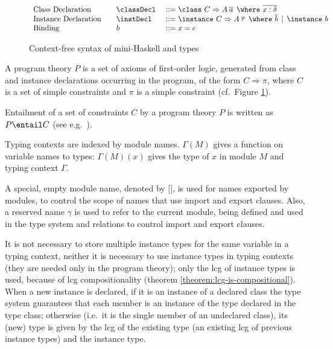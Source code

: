 \begin{figure}
\[\begin{array}[c]{llll}
\textrm{Class Declaration}  &         & \classDecl\    & ::= \class\ C \Rightarrow A\: \overline{a}\:\: \where\ \overline{x:\delta}\\
\textrm{Instance Declaration} &       & \instDecl\     & ::= \instance\ C \Rightarrow A\: \overline{\tau}\:\: \where\ \overline{b} 
                                                             \,\mid\, \instance\ b\\
\textrm{Binding}              &       & b              & ::= x = e 
\end{array} \]
\caption{Context-free syntax of mini-Haskell and types}
\label{fig:mini-Haskell-context-free-syntax}
\end{figure}

A program theory $P$ is a set of axioms of first-order logic,
generated from class and instance declarations occurring in the
program, of the form $C \Rightarrow \pi$, where $C$ is a set of simple
constraints and $\pi$ is a simple constraint (cf.~Figure
\ref{fig:mini-Haskell-context-free-syntax}).

Entailment of a set of constraints $C$ by a program theory $P$ is
written as $P \entail C$ (see
e.g.~\cite{JBCS-Ambiguity-and-constrained-polymorphism}).

Typing contexts are indexed by module names. $\Gamma(M)$ gives a
function on variable names to types: $\Gamma(M)(x)$ gives the type of
$x$ in module $M$ and typing context $\Gamma$.
   
A special, empty module name, denoted by $\texttt{[]}$, is used for
names exported by modules, to control the scope of names that use
import and export clauses. Also, a reserved name $\gamma$ is used to
refer to the current module, being defined and used in the type system
and relations to control import and export clauses.

It is not necessary to store multiple instance types for the same
variable in a typing context, neither it is necessary to use instance
types in typing contexts (they are needed only in the program theory);
only the lcg of instance types is used, because of lcg
compositionality (theorem \ref{theorem:lcg-is-compositional}). When a
new instance is declared, if it is an instance of a declared class the
type system guarantees that each member is an instance of the type
declared in the type class; otherwise (i.e.~it is the single member of
an undeclared class), its (new) type is given by the lcg of the
existing type (an existing lcg of previous instance types) and the
instance type.

